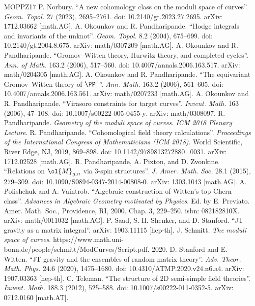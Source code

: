 \begin{thebibliography}{MOPPZ17}
 P. Norbury. ``A new cohomology class on the moduli space of curves''. \emph{Geom. Topol.} 27 (2023), 2695--2761. doi: 10.2140/gt.2023.27.2695. arXiv: 1712.03662 [math.AG].
 A. Okounkov and R. Pandharipande. ``Hodge integrals and invariants of the unknot''. \emph{Geom. Topol.} 8.2 (2004), 675--699. doi: 10.2140/gt.2004.8.675. arXiv: math/0307209 [math.AG].
 A. Okounkov and R. Pandharipande. ``Gromov--Witten theory, Hurwitz theory, and completed cycles''. \emph{Ann. of Math.} 163.2 (2006), 517--560. doi: 10.4007/annals.2006.163.517. arXiv: math/0204305 [math.AG].
 A. Okounkov and R. Pandharipande. ``The equivariant Gromov--Witten theory of $\PP^1$''. \emph{Ann. Math.} 163.2 (2006), 561--605. doi: 10.4007/annals.2006.163.561. arXiv: math/0207233 [math.AG].
 A. Okounkov and R. Pandharipande. ``Virasoro constraints for target curves''. \emph{Invent. Math.} 163 (2006), 47--108. doi: 10.1007/s00222-005-0455-y. arXiv: math/0308097.
 R. Pandharipande. \emph{Geometry of the moduli space of curves}. \emph{ICM 2018 Plenary Lecture}.
 R. Pandharipande. ``Cohomological field theory calculations''. \emph{Proceedings of the International Congress of Mathematicians (ICM 2018)}. World Scientific, River Edge, NJ, 2019, 869--898. doi: 10.1142/9789813272880\_0031. arXiv: 1712.02528 [math.AG].
 R. Pandharipande, A. Pixton, and D. Zvonkine. ``Relations on $\ol{M}_{g,n}$ via 3-spin structures''. \emph{J. Amer. Math. Soc.} 28.1 (2015), 279--309. doi: 10.1090/S0894-0347-2014-00808-0. arXiv: 1303.1043 [math.AG].
 A. Polishchuk and A. Vaintrob. ``Algebraic construction of Witten's top Chern class''. \emph{Advances in Algebraic Geometry motivated by Physics}. Ed. by E. Previato. Amer. Math. Soc., Providence, RI, 2000. Chap. 3, 229--250. isbn: 082182810X. arXiv: math/0011032 [math.AG].
 P. Saad, S. H. Shenker, and D. Stanford. ``JT gravity as a matrix integral''. arXiv: 1903.11115 [hep-th].
 J. Schmitt. \emph{The moduli space of curves}. https://www.math.uni-bonn.de/people/schmitt/ModCurves/Script.pdf. 2020.
 D. Stanford and E. Witten. ``JT gravity and the ensembles of random matrix theory''. \emph{Adv. Theor. Math. Phys.} 24.6 (2020), 1475--1680. doi: 10.4310/ATMP.2020.v24.n6.a4. arXiv: 1907.03363 [hep-th].
 C. Teleman. ``The structure of 2D semi-simple field theories''. \emph{Invent. Math.} 188.3 (2012), 525--588. doi: 10.1007/s00222-011-0352-5. arXiv: 0712.0160 [math.AT].

\end{thebibliography}
